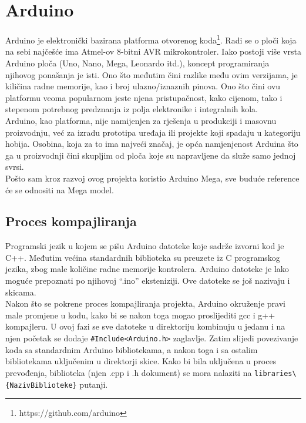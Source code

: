 \documentclass[../Document.tex]{subfiles}
\begin{document}
\section{Arduino}
Arduino je elektronički bazirana platforma otvorenog koda\footnote{https://github.com/arduino}. Radi se o ploči koja na sebi najčešće ima Atmel-ov 8-bitni AVR mikrokontroler. Iako postoji više vrsta Arduino ploča (Uno, Nano, Mega, Leonardo itd.), koncept programiranja njihovog ponašanja je isti. Ono što međutim čini razlike među ovim verzijama, je kiličina radne memorije, kao i broj ulazno/iznaznih pinova. Ono što čini ovu platformu veoma popularnom jeste njena pristupačnost, kako cijenom, tako i stepenom potrebnog predznanja iz polja elektronike i integralnih kola.\\

Arduino, kao platforma, nije namijenjen za rješenja u produkciji i masovnu proizvodnju, već za izradu prototipa uređaja ili projekte koji spadaju u kategoriju hobija. Osobina, koja za to ima najveći značaj, je opća namjenjenost Arduina što ga u proizvodnji čini skupljim od ploča koje su napravljene da služe samo jednoj svrsi.\\

Pošto sam kroz razvoj ovog projekta koristio Arduino Mega, sve buduće reference će se odnositi na Mega model.

\subsection{Proces kompajliranja}\label{kompajliranje}
Programski jezik u kojem se pišu Arduino datoteke koje sadrže izvorni kod je C++. Međutim većina standardnih biblioteka su preuzete iz C programskog jezika, zbog male količine radne memorije kontrolera. Arduino datoteke je lako moguće prepoznati po njihovoj ``.ino'' eksteniziji. Ove datoteke se još nazivaju i skicama.\\

Nakon što se pokrene proces kompajliranja projekta, Arduino okruženje pravi male promjene u kodu, kako bi se nakon toga mogao proslijediti gcc i g++ kompajleru. U ovoj fazi se sve datoteke u direktoriju kombinuju u jedanu i na njen početak se dodaje \verb|#Include<Arduino.h>| zaglavlje. Zatim slijedi povezivanje koda sa standardnim Arduino bibliotekama, a nakon toga i sa ostalim bibliotekama uključenim u direktorji skice. Kako bi bila uključena u proces prevođenja, biblioteka (njen .cpp i .h dokument) se mora nalaziti na \verb|libraries\{NazivBiblioteke}| putanji.\\
\end{document}
